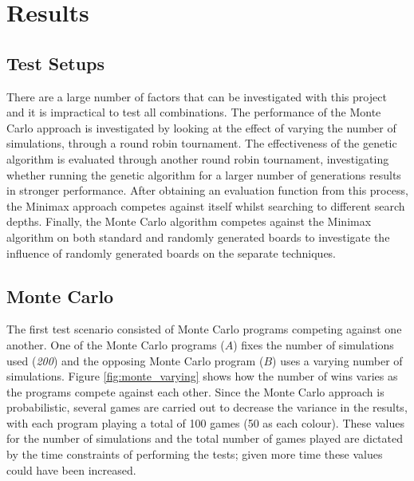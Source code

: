 \documentclass[12pt,a4paper]{article}
\begin{document}
\section{Results}

\subsection{Test Setups}

There are a large number of factors that can be investigated with this project and it is impractical to test all combinations. The performance of the Monte Carlo approach is investigated by looking at the effect of varying the number of simulations, through a round robin tournament. The effectiveness of the genetic algorithm is evaluated through another round robin tournament, investigating whether running the genetic algorithm for a larger number of generations results in stronger performance. After obtaining an evaluation function from this process, the Minimax approach competes against itself whilst searching to different search depths. Finally, the Monte Carlo algorithm competes against the Minimax algorithm on both standard and randomly generated boards to investigate the influence of randomly generated boards on the separate techniques.


\subsection{Monte Carlo}

The first test scenario consisted of Monte Carlo programs competing against one another.  One of the Monte Carlo programs ($A$) fixes the number of simulations used (\textit{200}) and the opposing Monte Carlo program ($B$) uses a varying number of simulations. Figure \ref{fig:monte_varying} shows how the number of wins varies as the programs compete against each other. Since the Monte Carlo approach is probabilistic, several games are carried out to decrease the variance in the results, with each program playing a total of 100 games (50 as each colour). These values for the number of simulations and the total number of games played are dictated by the time constraints of performing the tests; given more time these values could have been increased.
\end{document}

